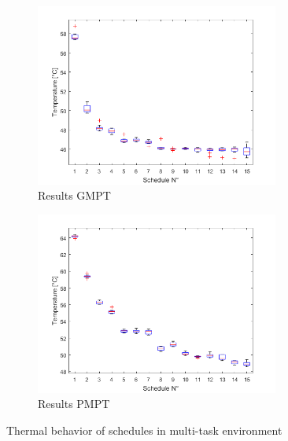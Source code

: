 \begin{figure}[H]
\begin{subfigure}{.5\textwidth}
  \centering
  \includegraphics[height=6cm]{figures/eval_gmpt2}
  \caption{Results GMPT}
  \label{fig:i_evg2_n}
\end{subfigure}%
\begin{subfigure}{.5\textwidth}
  \centering
  \includegraphics[height=6cm]{figures/eval_ampt}
  \caption{Results PMPT}
  \label{fig:i_eva_n}
\end{subfigure}
\caption[Results Multi-Task Notebook]{Thermal behavior of schedules in multi-task environment}
\label{fig:i_eva_ga_n}
\end{figure}